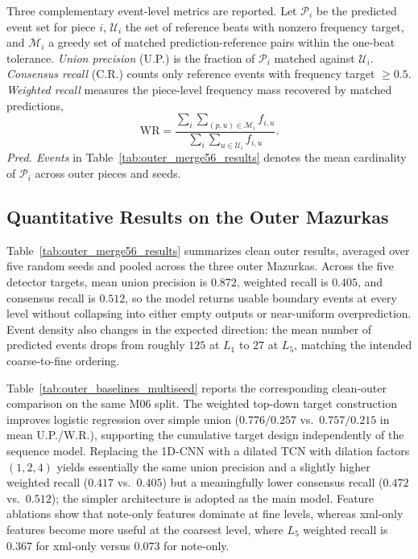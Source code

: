 \documentclass{article}
\begin{document}
Three complementary event-level metrics are reported. Let $\mathcal{P}_i$ be the predicted event set for piece $i$, $\mathcal{U}_i$ the set of reference beats with nonzero frequency target, and $\mathcal{M}_i$ a greedy set of matched prediction-reference pairs within the one-beat tolerance. \emph{Union precision} (U.P.) is the fraction of $\mathcal{P}_i$ matched against $\mathcal{U}_i$. \emph{Consensus recall} (C.R.) counts only reference events with frequency target $\geq 0.5$. \emph{Weighted recall} measures the piece-level frequency mass recovered by matched predictions,
\begin{equation}
\mathrm{WR} =
\frac{\sum_i \sum_{(p,u)\in\mathcal{M}_i} f_{i,u}}
     {\sum_i \sum_{u\in\mathcal{U}_i} f_{i,u}}.
\end{equation}
\emph{Pred. Events} in Table~\ref{tab:outer_merge56_results} denotes the mean cardinality of $\mathcal{P}_i$ across outer pieces and seeds.

\subsection{Quantitative Results on the Outer Mazurkas}\label{subsec:outer_results}

Table~\ref{tab:outer_merge56_results} summarizes clean outer results, averaged over five random seeds and pooled across the three outer Mazurkas. Across the five detector targets, mean union precision is $0.872$, weighted recall is $0.405$, and consensus recall is $0.512$, so the model returns usable boundary events at every level without collapsing into either empty outputs or near-uniform overprediction. Event density also changes in the expected direction: the mean number of predicted events drops from roughly $125$ at $L_1$ to $27$ at $L_5$, matching the intended coarse-to-fine ordering.

Table~\ref{tab:outer_baselines_multiseed} reports the corresponding clean-outer comparison on the same M06 split. The weighted top-down target construction improves logistic regression over simple union ($0.776/0.257$ vs.\ $0.757/0.215$ in mean U.P./W.R.), supporting the cumulative target design independently of the sequence model. Replacing the 1D-CNN with a dilated TCN with dilation factors $(1,2,4)$ yields essentially the same union precision and a slightly higher weighted recall ($0.417$ vs.\ $0.405$) but a meaningfully lower consensus recall ($0.472$ vs.\ $0.512$); the simpler architecture is adopted as the main model. Feature ablations show that note-only features dominate at fine levels, whereas xml-only features become more useful at the coarsest level, where $L_5$ weighted recall is $0.367$ for xml-only versus $0.073$ for note-only.
\end{document}
